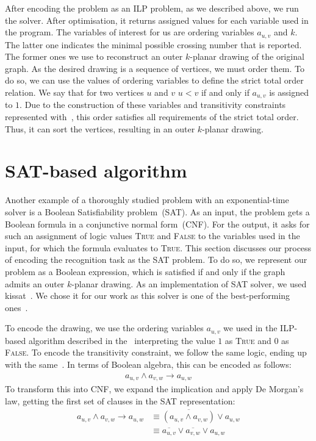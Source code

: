 After encoding the problem as an ILP problem, as we described above, we run the solver. After optimisation, it returns assigned values for each variable used in the program. The variables of interest for us are ordering variables \(a_{u, v}\) and \(k\). The latter one indicates the minimal possible crossing number that is reported. The former ones we use to reconstruct an outer \(k\)-planar drawing of the original graph. As the desired drawing is a sequence of vertices, we must order them. To do so, we can use the values of ordering variables to define the strict total order relation. We say that for two vertices \(u\) and \(v\) \(u < v\) if and only if \(a_{u, v}\) is assigned to \(1\). Due to the construction of these variables and transitivity constraints represented with~, this order satisfies all requirements of the strict total order. Thus, it can sort the vertices, resulting in an outer \(k\)-planar drawing.


\section{SAT-based algorithm}\label{sec:SAT-def}

Another example of a thoroughly studied problem with an exponential-time solver is a Boolean Satisfiability problem~(SAT). As an input, the problem gets a Boolean formula in a conjunctive normal form~(CNF). For the output, it asks for such an assignment of logic values \textsc{True} and \textsc{False} to the variables used in the input, for which the formula evaluates to \textsc{True}. This section discusses our process of encoding the recognition task as the SAT problem. To do so, we represent our problem as a Boolean expression, which is satisfied if and only if the graph admits an outer \(k\)-planar drawing. As an implementation of SAT solver, we used kissat~\cite{kissat,kissat-library}. We chose it for our work as this solver is one of the best-performing ones~\cite{sat-competition}.

To encode the drawing, we use the ordering variables \(a_{u, v}\) we used in the ILP-based algorithm described in the~ interpreting the value \(1\) as \textsc{True} and \(0\) as \textsc{False}. To encode the transitivity constraint, we follow the same logic, ending up with the same~. In terms of Boolean algebra, this can be encoded as follows:
\begin{align*}
    a_{u, v} \land a_{v, w} \rightarrow a_{u, w}
\end{align*}
To transform this into CNF, we expand the implication and apply De Morgan's law, getting the first set of clauses in the SAT representation:
\begin{align}
    a_{u, v} \land a_{v, w} \rightarrow a_{u, w}
    &\equiv \overline{(a_{u, v} \land a_{v, w})} \lor a_{u, w} \nonumber \\
    &\equiv \overline{a_{u, v}} \lor \overline{a_{v, w}} \lor a_{u, w} \label{sat:trans}
\end{align}

